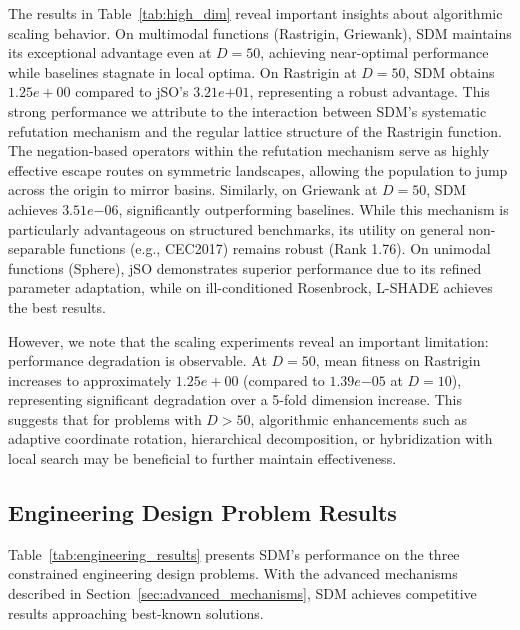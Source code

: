 \documentclass[11pt]{article}
\begin{document}
The results in Table~\ref{tab:high_dim} reveal important insights about algorithmic scaling behavior. On multimodal functions (Rastrigin, Griewank), SDM maintains its exceptional advantage even at $D=50$, achieving near-optimal performance while baselines stagnate in local optima. On Rastrigin at $D=50$, SDM obtains $1.25e+00$ compared to jSO's $3.21e{+01}$, representing a robust advantage. This strong performance we attribute to the interaction between SDM's systematic refutation mechanism and the regular lattice structure of the Rastrigin function. The negation-based operators within the refutation mechanism serve as highly effective escape routes on symmetric landscapes, allowing the population to jump across the origin to mirror basins. Similarly, on Griewank at $D=50$, SDM achieves $3.51e{-06}$, significantly outperforming baselines. While this mechanism is particularly advantageous on structured benchmarks, its utility on general non-separable functions (e.g., CEC2017) remains robust (Rank 1.76). On unimodal functions (Sphere), jSO demonstrates superior performance due to its refined parameter adaptation, while on ill-conditioned Rosenbrock, L-SHADE achieves the best results.

However, we note that the scaling experiments reveal an important limitation: performance degradation is observable. At $D=50$, mean fitness on Rastrigin increases to approximately $1.25e+00$ (compared to $1.39e{-05}$ at $D=10$), representing significant degradation over a 5-fold dimension increase. This suggests that for problems with $D > 50$, algorithmic enhancements such as adaptive coordinate rotation, hierarchical decomposition, or hybridization with local search may be beneficial to further maintain effectiveness.

\subsection{Engineering Design Problem Results}
\label{sec:engineering_results}

Table~\ref{tab:engineering_results} presents SDM's performance on the three constrained engineering design problems. With the advanced mechanisms described in Section~\ref{sec:advanced_mechanisms}, SDM achieves competitive results approaching best-known solutions.
\end{document}
